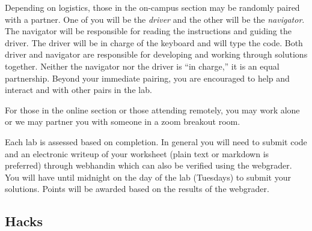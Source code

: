 \documentclass[12pt]{scrartcl}
\begin{document}
Depending on logistics, those in the on-campus section may be
randomly paired with a partner.  One of you will 
be the \emph{driver} and the other will be the \emph{navigator}.  
The navigator will be responsible for reading the instructions 
and guiding the driver.  The driver will be in charge of the 
keyboard and will type the code.  Both driver and navigator are 
responsible for developing and working through solutions together.
Neither the navigator nor the driver is ``in charge,'' it is an 
equal partnership.  Beyond your immediate pairing, you are 
encouraged to help and interact and with other pairs in the lab.

For those in the online section or those attending remotely, you 
may work alone or we may partner you with someone in a zoom 
breakout room.  

Each lab is assessed based on completion.  In general you will
need to submit code and an electronic writeup of your worksheet
(plain text or markdown is preferred) through webhandin which
can also be verified using the webgrader.  You will have until
midnight on the day of the lab (Tuesdays) to submit your solutions.
Points will be awarded based on the results of the webgrader.


%

\subsection{Hacks}
\end{document}
